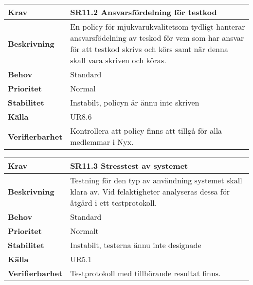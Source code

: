 \documentclass[a4paper, twoside, 11pt, titlepage]{article}
\begin{document}
\begin{tabular} { p{2.6cm} p{12.5cm} }
	\hline
	\sffamily\textbf{Krav} & \sffamily\textbf{SR11.2 Ansvarsfördelning för testkod } \\
	\hline
	\sffamily\textbf{Beskrivning} &  En policy för mjukvarukvalitetsom tydligt hanterar ansvarsfödelning av teskod för vem som har ansvar för att testkod skrivs och körs samt när denna skall vara skriven och köras.  \\
	\hline
	\sffamily\textbf{Behov} &  Standard  \\
	\hline
	\sffamily\textbf{Prioritet} &  Normal  \\
	\hline
	\sffamily\textbf{Stabilitet} &  Instabilt, policyn är ännu inte skriven  \\
	\hline
	\sffamily\textbf{Källa} &  UR8.6   \\
	\hline
	\sffamily\textbf{Verifierbarhet} &  Kontrollera att policy finns att tillgå för alla medlemmar i Nyx.  \\
	\hline
\end{tabular}
\vspace{6mm}

\begin{tabular} { p{2.6cm} p{12.5cm} }
	\hline
	\sffamily\textbf{Krav} & \sffamily\textbf{SR11.3 Stresstest av systemet } \\
	\hline
	\sffamily\textbf{Beskrivning} & Testning för den typ av användning systemet skall klara av. Vid felaktigheter analyseras dessa för åtgärd i ett testprotokoll.   \\
	\hline
	\sffamily\textbf{Behov} & Standard  \\
	\hline
	\sffamily\textbf{Prioritet} &  Normalt  \\
	\hline
	\sffamily\textbf{Stabilitet} &  Instabilt, testerna ännu inte designade  \\
	\hline
	\sffamily\textbf{Källa} &  UR5.1   \\
	\hline
	\sffamily\textbf{Verifierbarhet} &  Testprotokoll med tillhörande resultat finns.   \\
	\hline
\end{tabular}
\vspace{6mm}
\end{document}
